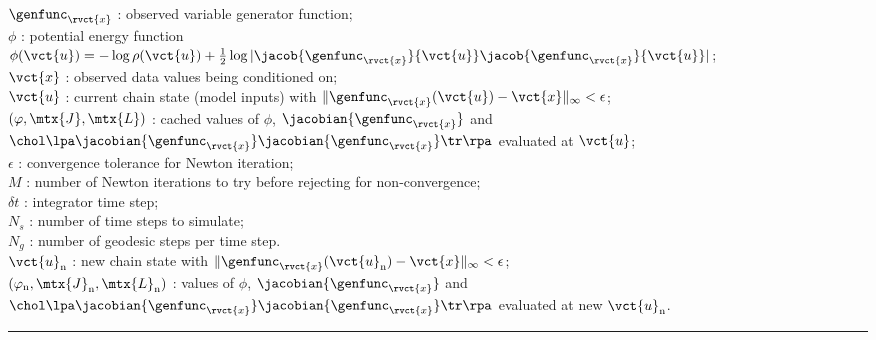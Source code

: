 \begin{algorithmic}
\small
    \Require\\
    $\genfunc_{\rvct{x}}$ : observed variable generator function; \\
    $\phi$ : potential energy function $\phi(\vct{u}) = -\log\rho(\vct{u}) + \frac{1}{2}\log|\jacob{\genfunc_{\rvct{x}}}{\vct{u}}\jacob{\genfunc_{\rvct{x}}}{\vct{u}}|$;\\
    $\vct{x}$ : observed data values being conditioned on; \\
    $\vct{u}$ : current chain state (model inputs) with $\Vert\genfunc_{\rvct{x}}(\vct{u}) - \vct{x}\Vert_\infty < \epsilon$;\\%
    $(\varphi, \mtx{J}, \mtx{L})$ : cached values of $\phi$, $\jacobian{\genfunc_{\rvct{x}}}$ and $\chol\lpa\jacobian{\genfunc_{\rvct{x}}}\jacobian{\genfunc_{\rvct{x}}}\phantom{}\tr\rpa$ evaluated at $\vct{u}$; \\
    $\epsilon$ : convergence tolerance for Newton iteration;\\
    $M$ : number of Newton iterations to try before rejecting for non-convergence; \\
    $\delta t$ : integrator time step; \\
    $N_s$ : number of time steps to simulate; \\
    $N_g$ : number of geodesic steps per time step.
    \Ensure\\
    $\vct{u}_{\mathrm{n}}$ : new chain state with $\Vert\genfunc_{\rvct{x}}(\vct{u}_{\textrm{n}}) - \vct{x}\Vert_\infty < \epsilon$; \\%
    $(\varphi_{\textrm{n}},\mtx{J}_{\mathrm{n}}, \mtx{L}_{\mathrm{n}})$ : values of $\phi$, $\jacobian{\genfunc_{\rvct{x}}}$ and $\chol\lpa\jacobian{\genfunc_{\rvct{x}}}\jacobian{\genfunc_{\rvct{x}}}\phantom{}\tr\rpa$ evaluated at new $\vct{u}_{\textrm{n}}$.
\end{algorithmic}
\vspace{1mm}
\hrule

